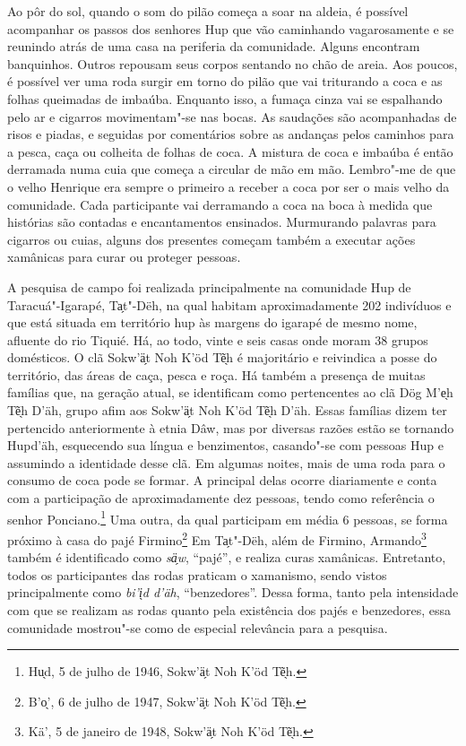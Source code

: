 Ao pôr do sol, quando o som do pilão começa a soar na aldeia, é possível
acompanhar os passos dos senhores Hup que vão caminhando vagarosamente e
se reunindo atrás de uma casa na periferia da comunidade. Alguns
encontram banquinhos. Outros repousam seus corpos sentando no chão de
areia. Aos poucos, é possível ver uma roda surgir em torno do pilão que
vai triturando a coca e as folhas queimadas de imbaúba. Enquanto isso, a
fumaça cinza vai se espalhando pelo ar e cigarros movimentam"-se nas
bocas. As saudações são acompanhadas de risos e piadas, e seguidas por
comentários sobre as andanças pelos caminhos para a pesca, caça ou
colheita de folhas de coca. A mistura de coca e imbaúba é então
derramada numa cuia que começa a circular de mão em mão. Lembro"-me de
que o velho Henrique era sempre o primeiro a receber a coca por ser o
mais velho da comunidade. Cada participante vai derramando a coca na
boca à medida que histórias são contadas e encantamentos ensinados.
Murmurando palavras para cigarros ou cuias, alguns dos presentes começam
também a executar ações xamânicas para curar ou proteger pessoas.

A pesquisa de campo foi realizada principalmente na comunidade Hup de
Taracuá"-Igarapé, Ta̗t"-Dëh, na qual habitam aproximadamente 202
indivíduos e que está situada em território hup às margens do igarapé de
mesmo nome, afluente do rio Tiquié. Há, ao todo, vinte e seis casas onde
moram 38 grupos domésticos. O clã Sokw'ä̗t Noh K'öd Tẽ̖h é majoritário e
reivindica a posse do território, das áreas de caça, pesca e roça. Há
também a presença de muitas famílias que, na geração atual, se
identificam como pertencentes ao clã Dög M'e̖h Tẽ̖h D'äh, grupo afim aos
Sokw'ä̗t Noh K'öd Tẽ̖h D'äh. Essas famílias dizem ter pertencido
anteriormente à etnia Dâw, mas por diversas razões estão se tornando
Hupd'äh, esquecendo sua língua e benzimentos, casando"-se com pessoas Hup
e assumindo a identidade desse clã. Em algumas noites, mais de uma roda
para o consumo de coca pode se formar. A principal delas ocorre
diariamente e conta com a participação de aproximadamente dez pessoas,
tendo como referência o senhor Ponciano.\footnote{Hu̖d, 5 de julho de 1946, Sokw'ä̗t Noh
K'öd Tẽ̖h.} Uma outra, da qual participam em média 6 pessoas, se
forma próximo à casa do pajé Firmino\footnote{B'o̖', 6 de julho de 1947, Sokw'ä̗t Noh
K'öd Tẽ̖h.} Em Ta̗t"-Dëh, além de Firmino, Armando\footnote{Kä',
5 de janeiro de 1948, Sokw'ä̗t Noh K'öd Tẽ̖h.} também é identificado como
\textit{sä̗w}, ``pajé'', e realiza curas xamânicas. Entretanto, todos os
participantes das rodas praticam o xamanismo, sendo vistos
principalmente como \textit{bi'i̖d d'äh}, ``benzedores''. Dessa forma, tanto
pela intensidade com que se realizam as rodas quanto pela existência dos
pajés e benzedores, essa comunidade mostrou"-se como de especial
relevância para a pesquisa.

